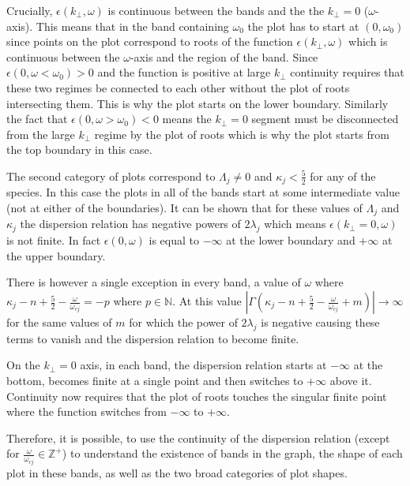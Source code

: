 \documentclass[12pt,a4paper]{article}
\begin{document}
    Crucially, $\epsilon(k_\perp, \omega)$ is continuous between the bands and the the $k_\perp = 0$ ($\omega$-axis).
    This means that in the band containing $\omega_0$ the plot has to start at $(0, \omega_0)$ since points on the plot correspond to roots of the function $\epsilon(k_\perp, \omega)$ which is continuous between the $\omega$-axis and the region of the band.
    Since $\epsilon(0, \omega < \omega_0) > 0$ and the function is positive at large $k_\perp$ continuity requires that these two regimes be connected to each other without the plot of roots intersecting them.
    This is why the plot starts on the lower boundary.
    Similarly the fact that $\epsilon(0, \omega > \omega_0) < 0$ means the $k_\perp = 0$ segment must be disconnected from the large $k_\perp$ regime by the plot of roots which is why the plot starts from the top boundary in this case.

    The second category of plots correspond to $\Lambda_j \neq 0$ and $\kappa_j < \frac{5}{2}$ for any of the species. In this case the plots in all of the bands start at some intermediate value (not at either of the boundaries).
    It can be shown that for these values of $\Lambda_j$ and $\kappa_j$ the dispersion relation has negative powers of $2 \lambda_j$ which means $\epsilon(k_\perp = 0, \omega)$ is not finite.
    In fact $\epsilon(0, \omega)$ is equal to $-\infty$ at the lower boundary and $+\infty$ at the upper boundary.

    There is however a single exception in every band, a value of $\omega$ where $\kappa_j - n + \frac{5}{2} - \frac{\omega}{\omega_{cj}} = -p$ where $p \in \mathbb{N}$.
    At this value $\left| \Gamma (\kappa_j - n + \frac{5}{2} - \frac{\omega}{\omega_{cj}} + m) \right| \rightarrow \infty$ for the same values of $m$ for which the power of $2 \lambda_j$ is negative causing these terms to vanish and the dispersion relation to become finite.

    On the $k_\perp = 0$ axis, in each band, the dispersion relation starts at $-\infty$ at the bottom, becomes finite at a single point and then switches to $+\infty$ above it.
    Continuity now requires that the plot of roots touches the singular finite point where the function switches from $-\infty$ to $+\infty$.

    Therefore, it is possible, to use the continuity of the dispersion relation (except for $\frac{\omega}{\omega_{cj}} \in \mathbb{Z}^+$) to understand the existence of bands in the graph, the shape of each plot in these bands, as well as the two broad categories of plot shapes.
\end{document}
